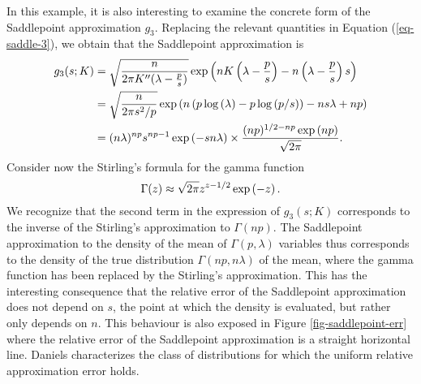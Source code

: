 \begin{example}
    In this example, it is also interesting to examine the concrete form of the Saddlepoint approximation $g_3$. Replacing the relevant quantities in Equation (\ref{eq-saddle-3}), we obtain that the Saddlepoint approximation is
    \begin{align*}
        g_3(s; K) &= \sqrt{\frac{n}{2\pi K''(\lambda - \frac{p}{s})}} \exp\left(nK\left(\lambda - \frac{p}{s}\right) - n\left(\lambda - \frac{p}{s}\right)s\right)\\
        &= \sqrt{\frac{n}{2\pi s^2/p}} \exp\left(n\left(p\log\left(\lambda\right) - p\log\left(p/s\right)\right) - ns\lambda + np\right)\\
        &= (n\lambda)^{np}s^{np-1}\exp\left(-sn\lambda\right) \times \frac{(np)^{1/2-np}\exp\left(np\right)}{\sqrt{2\pi}}.
    \end{align*}
    Consider now the Stirling's formula for the gamma function
    \begin{equation*}
        \Gamma(z) \approx \sqrt{2\pi}z^{z-1/2}\exp\left(-z\right).
    \end{equation*}
    We recognize that the second term in the expression of $g_3(s; K)$ corresponds to the inverse of the Stirling's approximation to $\Gamma(np)$. The Saddlepoint approximation to the density of the mean of $\Gamma(p, \lambda)$ variables thus corresponds to the density of the true distribution $\Gamma(np, n\lambda)$ of the mean, where the gamma function has been replaced by the Stirling's approximation. This has the interesting consequence that the relative error of the Saddlepoint approximation does not depend on $s$, the point at which the density is evaluated, but rather only depends on $n$. This behaviour is also exposed in Figure \ref{fig-saddlepoint-err} where the relative error of the Saddlepoint approximation is a straight horizontal line. Daniels \cite{daniels1954saddlepoint} characterizes the class of distributions for which the uniform relative approximation error holds.
\end{example}


